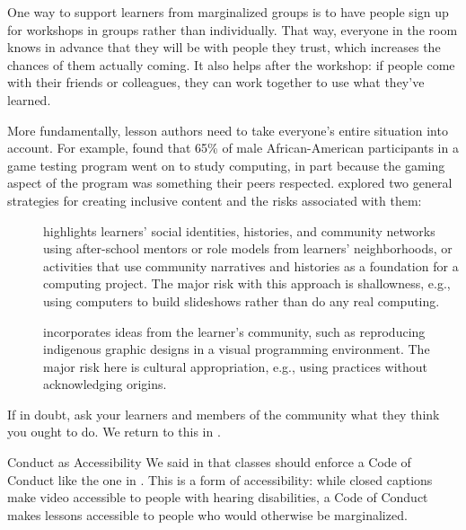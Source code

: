 One way to support learners from marginalized groups is
to have people sign up for workshops in groups rather than individually.
That way,
everyone in the room knows in advance that they will be with people they trust,
which increases the chances of them actually coming.
It also helps after the workshop:
if people come with their friends or colleagues,
they can work together to use what they've learned.

More fundamentally,
lesson authors need to take everyone's entire situation into account.
For example,
\cite{DiSa2014a} found that 65\% of male African-American participants in a game testing program went on to study computing,
in part because the gaming aspect of the program was something their peers respected.
\cite{Lach2018} explored two general strategies for creating inclusive content
and the risks associated with them:

\begin{description}

\item[{}]
  highlights learners' social identities, histories, and community networks
  using after-school mentors or role models from learners' neighborhoods,
  or activities that use community narratives and histories
  as a foundation for a computing project.
  The major risk with this approach is shallowness,
  e.g.,
  using computers to build slideshows rather than do any real computing.

\item[{}]
  incorporates ideas from the learner's community,
  such as reproducing indigenous graphic designs in a visual programming environment.
  The major risk here is cultural appropriation,
  e.g.,
  using practices without acknowledging origins.

\end{description}

If in doubt,
ask your learners and members of the community what they think you ought to do.
We return to this in .

\begin{aside}{Conduct as Accessibility}
  We said in  that classes should enforce a Code of Conduct like the one in .
  This is a form of accessibility:
  while closed captions make video accessible to people with hearing disabilities,
  a Code of Conduct makes lessons accessible to people who would otherwise be marginalized.
\end{aside}

